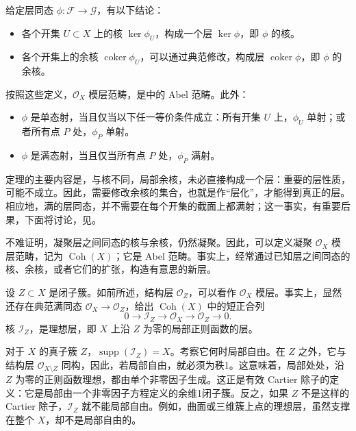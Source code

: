 \begin{theorem}\label{thm:4.41}
给定层同态 $\phi\colon\mathcal{F}\to\mathcal{G}$，有以下结论：
\begin{itemize}
\item 各个开集 $U\subset X$ 上的核 $\ker\phi_U$，构成一个层 $\ker\phi$，即 $\phi$ 的核。
\item 各个开集上的余核 $\operatorname{coker}\phi_U$，可以通过典范修改，构成层 $\operatorname{coker}\phi$，即 $\phi$ 的余核。
\end{itemize}
按照这些定义，$\mathcal{O}_X$ 模层范畴，是中的 Abel 范畴。此外：
\begin{itemize}
\item $\phi$ 是单态射，当且仅当以下任一等价条件成立：所有开集 $U$ 上，$\phi_U$ 单射；或者所有点 $P$ 处，$\phi_P$ 单射。
\item $\phi$ 是满态射，当且仅当所有点 $P$ 处，$\phi_P$ 满射。
\end{itemize}
\end{theorem}

定理的主要内容是，与核不同，局部余核，未必直接构成一个层：重要的层性质，可能不成立。因此，需要修改余核的集合，也就是作“层化”，才能得到真正的层。相应地，满的层同态，并不需要在每个开集的截面上都满射；这一事实，有重要后果，下面将讨论，见。

不难证明，凝聚层之间同态的核与余核，仍然凝聚。因此，可以定义凝聚 $\mathcal{O}_X$ 模层范畴，记为 $\operatorname{Coh}(X)$；它是 Abel 范畴。事实上，经常通过已知层之间同态的核、余核，或者它们的扩张，构造有意思的新层。

\begin{example}\label{ex:4.42}
设 $Z\subset X$ 是闭子簇。如前所述，结构层 $\mathcal{O}_Z$，可以看作 $\mathcal{O}_X$ 模层。事实上，显然还存在典范满同态 $\mathcal{O}_X\to\mathcal{O}_Z$，给出 $\operatorname{Coh}(X)$ 中的短正合列
\[
0\longrightarrow\mathcal{I}_Z\longrightarrow\mathcal{O}_X
\longrightarrow\mathcal{O}_Z\longrightarrow0.
\]
核 $\mathcal{I}_Z$，是理想层，即 $X$ 上沿 $Z$ 为零的局部正则函数的层。

对于 $X$ 的真子簇 $Z$，$\operatorname{supp}(\mathcal{I}_Z)=X$。考察它何时局部自由。在 $Z$ 之外，它与结构层 $\mathcal{O}_{X\setminus Z}$ 同构，因此，若局部自由，就必须为秩1。这意味着，局部处处，沿 $Z$ 为零的正则函数理想，都由单个非零因子生成。这正是有效 Cartier 除子的定义：它是局部由一个非零因子方程定义的余维1闭子簇。反之，如果 $Z$ 不是这样的 Cartier 除子，$\mathcal{I}_Z$ 就不能局部自由。例如，曲面或三维簇上点的理想层，虽然支撑在整个 $X$，却不是局部自由的。
\end{example}

